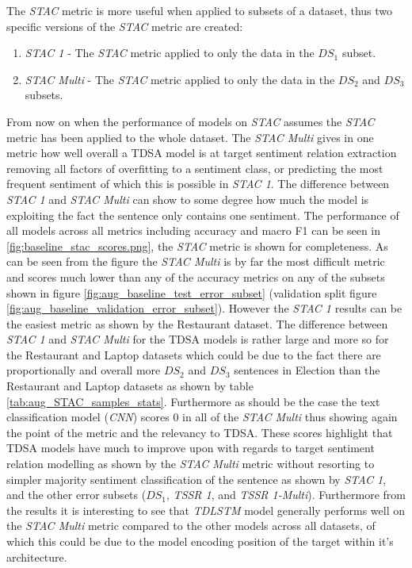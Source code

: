 The \textit{STAC} metric is more useful when applied to subsets of a dataset, thus two specific versions of the \textit{STAC} metric are created:
\begin{enumerate}
    \item \textit{STAC 1} - The \textit{STAC} metric applied to only the data in the $DS_1$ subset.
    \item \textit{STAC Multi} - The \textit{STAC} metric applied to only the data in the $DS_2$ and $DS_3$ subsets.
\end{enumerate}
From now on when the performance of models on \textit{STAC} assumes the \textit{STAC} metric has been applied to the whole dataset. The \textit{STAC Multi} gives in one metric how well overall a TDSA model is at target sentiment relation extraction removing all factors of overfitting to a sentiment class, or predicting the most frequent sentiment of which this is possible in \textit{STAC 1}. The difference between \textit{STAC 1} and \textit{STAC Multi} can show to some degree how much the model is exploiting the fact the sentence only contains one sentiment. The performance of all models across all metrics including accuracy and macro F1 can be seen in \ref{fig:baseline_stac_scores.png}, the \textit{STAC} metric is shown for completeness. As can be seen from the figure the \textit{STAC Multi} is by far the most difficult metric and scores much lower than any of the accuracy metrics on any of the subsets shown in figure \ref{fig:aug_baseline_test_error_subset} (validation split figure \ref{fig:aug_baseline_validation_error_subset}). However the \textit{STAC 1} results can be the easiest metric as shown by the Restaurant dataset. The difference between \textit{STAC 1} and \textit{STAC Multi} for the TDSA models is rather large and more so for the Restaurant and Laptop datasets which could be due to the fact there are proportionally and overall more $DS_2$ and $DS_3$ sentences in Election than the Restaurant and Laptop datasets as shown by table \ref{tab:aug_STAC_samples_stats}. Furthermore as should be the case the text classification model (\textit{CNN}) scores $0$ in all of the \textit{STAC Multi} thus showing again the point of the metric and the relevancy to TDSA. These scores highlight that TDSA models have much to improve upon with regards to target sentiment relation modelling as shown by the \textit{STAC Multi} metric without resorting to simpler majority sentiment classification of the sentence as shown by \textit{STAC 1}, and the other error subsets ($DS_1$, \textit{TSSR 1}, and \textit{TSSR 1-Multi}). Furthermore from the results it is interesting to see that \textit{TDLSTM} model generally performs well on the \textit{STAC Multi} metric compared to the other models across all datasets, of which this could be due to the model encoding position of the target within it's architecture. 

